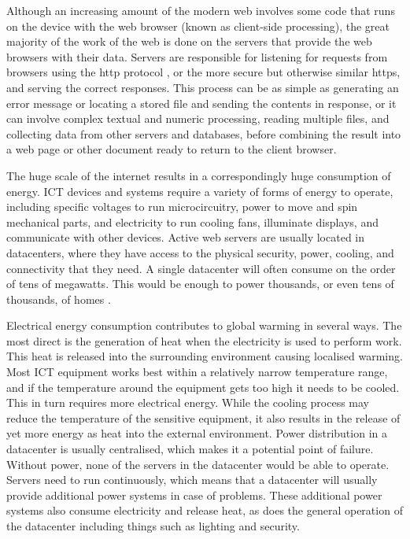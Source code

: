 Although an increasing amount of the modern web involves some code that runs on the device with the web browser (known as \gls{client-side processing}), the great majority of the work of the web is done on the servers that provide the web browsers with their data. Servers are responsible for listening for requests from browsers using the \gls{http} protocol \citep{rfc2616}, or the more secure but otherwise similar \gls{https}, and serving the correct responses. This process can be as simple as generating an error message or locating a stored file and sending the contents in response, or it can involve complex textual and numeric processing, reading multiple files, and collecting data from other servers and databases, before combining the result into a web page or other document ready to return to the client browser.

The huge scale of the internet results in a correspondingly huge consumption of energy. \gls{ICT} devices and systems require a variety of forms of energy to operate, including specific voltages to run microcircuitry, power to move and spin mechanical parts, and electricity to run cooling fans, illuminate displays, and communicate with other devices. Active web servers are usually located in \gls{datacenter}s, where they have access to the physical security, power, cooling, and connectivity that they need. A single datacenter will often consume on the order of tens of megawatts. This would be enough to power thousands, or even tens of thousands, of homes \citep{Law2022}.

Electrical energy consumption contributes to \gls{global warming} in several ways. The most direct is the generation of heat when the electricity is used to perform work. This heat is released into the surrounding environment causing localised warming. Most \gls{ICT} equipment works best within a relatively narrow temperature range, and if the temperature around the equipment gets too high it needs to be cooled. This in turn requires more electrical energy. While the cooling process may reduce the temperature of the sensitive equipment, it also results in the release of yet more energy as heat into the external environment. Power distribution in a datacenter is usually centralised, which makes it a potential point of failure. Without power, none of the servers in the datacenter would be able to operate. Servers need to run continuously, which means that a datacenter will usually provide additional power systems in case of problems. These additional power systems also consume electricity and release heat, as does the general operation of the datacenter including things such as lighting and security.

